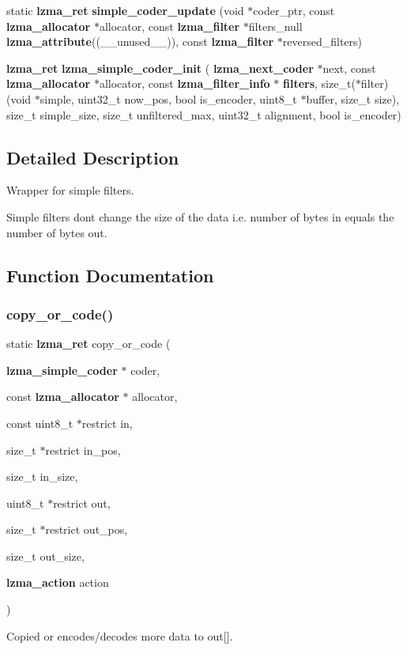 \begin{DoxyCompactItemize}
static \textbf{ lzma\+\_\+ret} {\bfseries simple\+\_\+coder\+\_\+update} (void $\ast$coder\+\_\+ptr, const \textbf{ lzma\+\_\+allocator} $\ast$allocator, const \textbf{ lzma\+\_\+filter} $\ast$filters\+\_\+null \textbf{ lzma\+\_\+attribute}((\+\_\+\+\_\+unused\+\_\+\+\_\+)), const \textbf{ lzma\+\_\+filter} $\ast$reversed\+\_\+filters)
\item 
\mbox{\label{simple__coder_8c_aff53ad35e18f4f61d0f53f52d9f0dcc7}} 
\textbf{ lzma\+\_\+ret} {\bfseries lzma\+\_\+simple\+\_\+coder\+\_\+init} (\textbf{ lzma\+\_\+next\+\_\+coder} $\ast$next, const \textbf{ lzma\+\_\+allocator} $\ast$allocator, const \textbf{ lzma\+\_\+filter\+\_\+info} $\ast$\textbf{ filters}, size\+\_\+t($\ast$filter)(void $\ast$simple, uint32\+\_\+t now\+\_\+pos, bool is\+\_\+encoder, uint8\+\_\+t $\ast$buffer, size\+\_\+t size), size\+\_\+t simple\+\_\+size, size\+\_\+t unfiltered\+\_\+max, uint32\+\_\+t alignment, bool is\+\_\+encoder)
\end{DoxyCompactItemize}


\subsection{Detailed Description}
Wrapper for simple filters. 

Simple filters don\textquotesingle{}t change the size of the data i.\+e. number of bytes in equals the number of bytes out. 

\subsection{Function Documentation}
\mbox{\label{simple__coder_8c_a9a9508cc7883974f7adfea0e517754c5}} 
\subsubsection{copy\+\_\+or\+\_\+code()}
{\footnotesize\ttfamily static \textbf{ lzma\+\_\+ret} copy\+\_\+or\+\_\+code (\begin{DoxyParamCaption}\item[{\textbf{ lzma\+\_\+simple\+\_\+coder} $\ast$}]{coder,  }\item[{const \textbf{ lzma\+\_\+allocator} $\ast$}]{allocator,  }\item[{const uint8\+\_\+t $\ast$restrict}]{in,  }\item[{size\+\_\+t $\ast$restrict}]{in\+\_\+pos,  }\item[{size\+\_\+t}]{in\+\_\+size,  }\item[{uint8\+\_\+t $\ast$restrict}]{out,  }\item[{size\+\_\+t $\ast$restrict}]{out\+\_\+pos,  }\item[{size\+\_\+t}]{out\+\_\+size,  }\item[{\textbf{ lzma\+\_\+action}}]{action }\end{DoxyParamCaption})\hspace{0.3cm}{\ttfamily [static]}}



Copied or encodes/decodes more data to out[]. 

